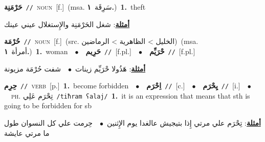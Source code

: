 \documentclass[10pt,a4paper,twoside]{article} %
\begin{document}
\begin{multicols}{2}
{\setlength\topsep{0pt}\textbf{\foreignlanguage{arabic}{حَرْمَنِة}}\ {\color{gray}\texttt{//}\color{black}}\ \textsc{noun}\ [f.]\ \color{gray}(msa. \foreignlanguage{arabic}{سَرِقَة}~\foreignlanguage{arabic}{\textbf{١.}})\color{black}\ \textbf{1.}~theft\  \begin{flushright}\color{gray}\foreignlanguage{arabic}{\textbf{\underline{\foreignlanguage{arabic}{أمثلة}}}: شغل الحَرْمَنِة والإِستغلال عيني عينك}\end{flushright}\color{black}} \vspace{2mm}

{\setlength\topsep{0pt}\textbf{\foreignlanguage{arabic}{حُرْمَة}}\ {\color{gray}\texttt{//}\color{black}}\ \textsc{noun}\ [f.]\ (src. \color{gray}\foreignlanguage{arabic}{الخليل > الظاهرية > الرماضين}\color{black})\ \color{gray}(msa. \foreignlanguage{arabic}{أمرأة}~\foreignlanguage{arabic}{\textbf{١.}})\color{black}\ \textbf{1.}~woman\ \ $\bullet$\ \ \setlength\topsep{0pt}\textbf{\foreignlanguage{arabic}{حَرِيم}}\ {\color{gray}\texttt{//}\color{black}}\ [f.pl.]\ \ $\bullet$\ \ \setlength\topsep{0pt}\textbf{\foreignlanguage{arabic}{حْرَيِّم}}\ {\color{gray}\texttt{//}\color{black}}\ [f.pl.]\  \begin{flushright}\color{gray}\foreignlanguage{arabic}{\textbf{\underline{\foreignlanguage{arabic}{أمثلة}}}: هَذُولا حْرَيِّم زينات\ $\bullet$\ \  شفت حُرْمَة مزيونة}\end{flushright}\color{black}} \vspace{2mm}

{\setlength\topsep{0pt}\textbf{\foreignlanguage{arabic}{حِرِم}}\ {\color{gray}\texttt{//}\color{black}}\ \textsc{verb}\ [p.]\ \textbf{1.}~become forbidden\ \ $\bullet$\ \ \setlength\topsep{0pt}\textbf{\foreignlanguage{arabic}{اِحْرَم}}\ {\color{gray}\texttt{//}\color{black}}\ [c.]\ \ $\bullet$\ \ \setlength\topsep{0pt}\textbf{\foreignlanguage{arabic}{يِحْرَم}}\ {\color{gray}\texttt{//}\color{black}}\ [i.]\ \ $\bullet$\ \ \textsc{ph.} \color{gray} \foreignlanguage{arabic}{تِحْرَم عَلِي}\color{black}\ {\color{gray}\texttt{/{\sffamily tiħram ʕalaj}/}\color{black}}\ \textbf{1.}~it is an expression that means that sth is going to be forbidden  for sb\  \begin{flushright}\color{gray}\foreignlanguage{arabic}{\textbf{\underline{\foreignlanguage{arabic}{أمثلة}}}: تِحْرَم علي مرتي إِذا بتيجيش عالغدا يوم الإِثنين\ $\bullet$\ \  حِرمت علي كل النسوان طول ما مرتي عايشة}\end{flushright}\color{black}} \vspace{2mm}


\end{multicols}
\end{document}
